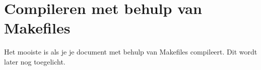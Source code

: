\label{ch:extra}

\section{Compileren met behulp van Makefiles}

Het mooiste is als je je document met behulp van Makefiles compileert.
Dit wordt later nog toegelicht.
